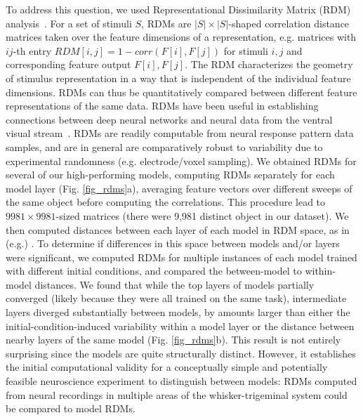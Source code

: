 To address this question, we used Representational Dissimilarity Matrix (RDM) analysis~\cite{Kriegeskorte2008}.
For a set of stimuli $S$, RDMs are $|S| \times |S|$-shaped correlation distance matrices taken over the feature dimensions of a representation, e.g. matrices with $ij$-th entry $RDM[i, j] = 1 - corr(F[i], F[j])$ for stimuli $i, j$ and corresponding feature output $F[i], F[j]$.
The RDM characterizes the geometry of stimulus representation in a way that is independent of the individual feature dimensions.  RDMs can thus be quantitatively compared between different feature representations of the same data.
RDMs have been useful in establishing connections between deep neural networks and neural data from the ventral visual stream~\cite{cadieu2014deep, Yamins2014, khaligh2014deep}. 
RDMs are readily computable from neural response pattern data samples, and are in general are comparatively robust to variability due to experimental randomness (e.g. electrode/voxel sampling).
We obtained RDMs for several of our high-performing models, computing RDMs separately for each model layer (Fig. \ref{fig_rdms}a), averaging feature vectors over different sweeps of the same object before computing the correlations.
This procedure lead to $9981\times9981$-sized matrices (there were 9,981 distinct object in our dataset).
We then computed distances between each layer of each model in RDM space, as in (e.g.) \cite{khaligh2014deep}.
To determine if differences in this space between models and/or layers were significant, we computed RDMs for multiple instances of each model trained with different initial conditions, and compared the between-model to within-model distances.
We found that while the top layers of models partially converged (likely because they were all trained on the same task), intermediate layers diverged substantially between models, by amounts larger than either the initial-condition-induced variability within a model layer or the distance between nearby layers of the same model (Fig. \ref{fig_rdms}b).
This result is not entirely surprising since the models are quite structurally distinct.  
However, it establishes the initial computational validity for a conceptually simple and potentially feasible neuroscience experiment to distinguish between models: RDMs computed from neural recordings in multiple areas of the whisker-trigeminal system could be compared to model RDMs.

